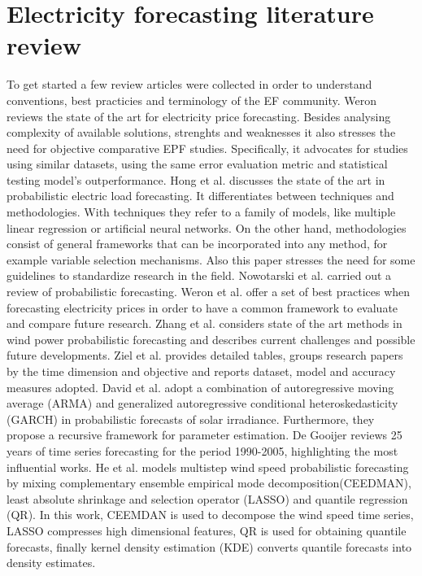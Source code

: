 \section{Electricity forecasting literature review}
To get started a few review articles were collected in order to understand conventions, best practicies and terminology of the EF community.
Weron \cite{EPF_review} reviews the state of the art for electricity price forecasting. Besides analysing complexity of available solutions, strenghts and weaknesses it also stresses the need for objective comparative EPF studies. Specifically, it advocates for studies using similar datasets, using the same error evaluation metric and statistical testing model's outperformance.
Hong et al. \cite{prob_elf} discusses the state of the art in probabilistic electric load forecasting. It differentiates between techniques and methodologies. With techniques they refer to a family of models, like multiple linear regression or artificial neural networks. On the other hand, methodologies consist of general frameworks that can be incorporated into any method, for example variable selection mechanisms. Also this paper stresses the need for some guidelines to standardize research in the field.
Nowotarski et al. \cite{nowotarski} carried out a review of probabilistic forecasting.
Weron et al. \cite{lago} offer a set of best practices when forecasting electricity prices in order to have a common framework to evaluate and compare future research.
Zhang et al. \cite{zhang2014review} considers state of the art methods in wind power probabilistic forecasting and describes current challenges and possible future developments.
Ziel et al. \cite{ziel2018probabilistic} provides detailed tables, groups research papers by the time dimension and objective and reports dataset, model and accuracy 
measures adopted.
David et al. \cite{david2016probabilistic} adopt a combination of autoregressive moving average (ARMA) and generalized autoregressive conditional heteroskedasticity (GARCH) in probabilistic forecasts of solar irradiance. Furthermore, they propose a recursive framework for parameter estimation.
De Gooijer \cite{de200625} reviews 25 years of time series forecasting for the period 1990-2005, highlighting the most influential works.
He et al. \cite{he2022cooperative} models  multistep wind speed probabilistic forecasting by mixing complementary ensemble empirical mode decomposition(CEEDMAN), least absolute shrinkage and selection operator (LASSO) and quantile regression (QR). In this work, CEEMDAN is used to decompose the wind speed time series, LASSO compresses high dimensional features, QR is used for obtaining quantile forecasts, finally kernel density estimation (KDE) converts quantile forecasts into density estimates.
